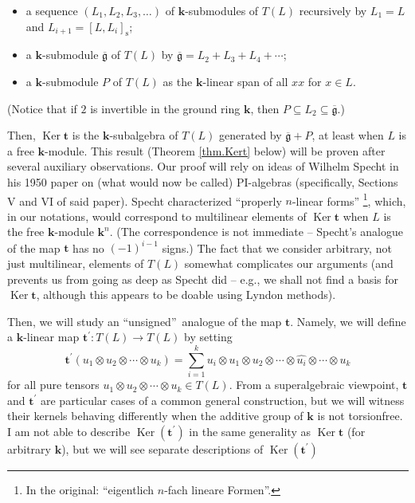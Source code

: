 \documentclass[numbers=enddot,12pt,final,onecolumn,notitlepage]{scrartcl}%
\theoremstyle{definition}
\let\sumnonlimits\sum
\renewcommand{\sum}{\sumnonlimits\limits}
\begin{document}
\begin{itemize}
\item a sequence $\left(  L_{1},L_{2},L_{3},\ldots\right)  $ of $\mathbf{k}%
$-submodules of $T\left(  L\right)  $ recursively by $L_{1}=L$ and
$L_{i+1}=\left[  L,L_{i}\right]  _{\operatorname*{s}}$;

\item a $\mathbf{k}$-submodule $\overline{\mathfrak{g}}$ of $T\left(
L\right)  $ by $\overline{\mathfrak{g}}=L_{2}+L_{3}+L_{4}+\cdots$;

\item a $\mathbf{k}$-submodule $P$ of $T\left(  L\right)  $ as the
$\mathbf{k}$-linear span of all $xx$ for $x\in L$.
\end{itemize}

(Notice that if $2$ is invertible in the ground ring $\mathbf{k}$, then
$P\subseteq L_{2}\subseteq\overline{\mathfrak{g}}$.)

Then, $\operatorname*{Ker}\mathbf{t}$ is the $\mathbf{k}$-subalgebra of
$T\left(  L\right)  $ generated by $\overline{\mathfrak{g}}+P$, at least when
$L$ is a free $\mathbf{k}$-module. This result (Theorem \ref{thm.Kert} below)
will be proven after several auxiliary observations. Our proof will rely on
ideas of Wilhelm Specht in his 1950 paper \cite{specht} on (what would now be
called) PI-algebras (specifically, Sections V and VI of said paper). Specht
characterized \textquotedblleft properly $n$-linear forms\textquotedblright%
\footnote{In the original: \textquotedblleft eigentlich $n$-fach lineare
Formen\textquotedblright.}, which, in our notations, would correspond to
multilinear elements of $\operatorname*{Ker}\mathbf{t}$ when $L$ is the free
$\mathbf{k}$-module $\mathbf{k}^{n}$. (The correspondence is not immediate --
Specht's analogue of the map $\mathbf{t}$ has no $\left(  -1\right)  ^{i-1}$
signs.) The fact that we consider arbitrary, not just multilinear, elements of
$T\left(  L\right)  $ somewhat complicates our arguments (and prevents us from
going as deep as Specht did -- e.g., we shall not find a basis for
$\operatorname*{Ker}\mathbf{t}$, although this appears to be doable using
Lyndon methods).

Then, we will study an \textquotedblleft unsigned\textquotedblright\ analogue
of the map $\mathbf{t}$. Namely, we will define a $\mathbf{k}$-linear map
$\mathbf{t}^{\prime}:T\left(  L\right)  \rightarrow T\left(  L\right)  $ by
setting%
\[
\mathbf{t}^{\prime}\left(  u_{1}\otimes u_{2}\otimes\cdots\otimes
u_{k}\right)  =\sum_{i=1}^{k}u_{i}\otimes u_{1}\otimes u_{2}\otimes
\cdots\otimes\widehat{u_{i}}\otimes\cdots\otimes u_{k}%
\]
for all pure tensors $u_{1}\otimes u_{2}\otimes\cdots\otimes u_{k}\in T\left(
L\right)  $. From a superalgebraic viewpoint, $\mathbf{t}$ and $\mathbf{t}%
^{\prime}$ are particular cases of a common general construction, but we will
witness their kernels behaving differently when the additive group of
$\mathbf{k}$ is not torsionfree. I am not able to describe
$\operatorname*{Ker}\left(  \mathbf{t}^{\prime}\right)  $ in the same
generality as $\operatorname*{Ker}\mathbf{t}$ (for arbitrary $\mathbf{k}$),
but we will see separate descriptions of $\operatorname*{Ker}\left(
\mathbf{t}^{\prime}\right)  $
\end{document}
